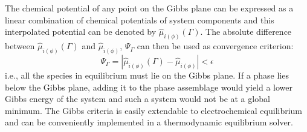	The chemical potential of any point on the Gibbs plane can be expressed as a linear combination of  chemical potentials of system components and this interpolated potential can be denoted by $\hat{\mu}_{i(\phi)}(\Gamma)$. The absolute difference between $\hat{\mu}_{i(\phi)}(\Gamma)$ and $\hat{\mu}_{i(\phi)}$, $\Psi_{\Gamma}$ can then be used as convergence criterion:
		\begin{equation}\label{eqn:convGC}
			\Psi_{\Gamma} = \left \vert  \hat{\mu}_{i(\phi)}(\Gamma) - \hat{\mu}_{i(\phi)} \right \vert < \epsilon
		\end{equation}
	 i.e., all the species in equilibrium must lie on the Gibbs plane. If a phase lies below the Gibbs plane, adding it to the phase assemblage would yield a lower Gibbs energy of the system and such a system would not be at a global minimum. The Gibbs criteria is easily extendable to electrochemical equilibrium and can be conveniently implemented in a thermodynamic equilibrium	 solver. 
	 
